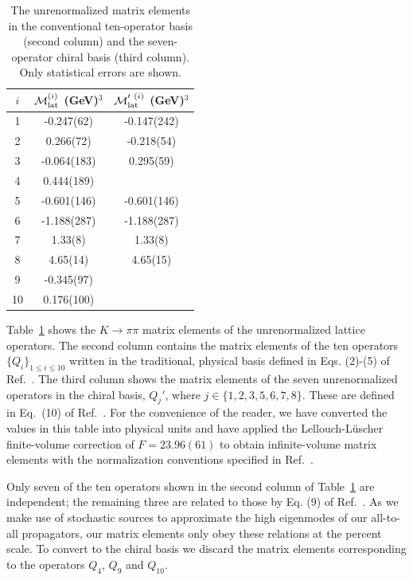 \documentclass[aps,prl,
superscriptaddress,
showpacs,
preprintnumbers,
bibnotes,
amsmath,
amssymb,
twocolumn,
floatfix,
]{revtex4-1}
\begin{document}
\begin{table}
\begin{tabular}{c|c||c}
\hline\hline
$i$  & ${\cal M}^{(i)}_{\rm lat}$ (GeV)$^3$ & ${\cal M}^{\prime\ (i)}_{\rm lat}$ (GeV)$^3$ \\
\hline
1  & -0.247(62)	&-0.147(242)		\\
2  & 0.266(72) 	&-0.218(54)		\\
3  & -0.064(183)	& 0.295(59)		\\
4  & 0.444(189) 	& \textemdash		\\
5  & -0.601(146) 	&-0.601(146)		\\
6  & -1.188(287)	&-1.188(287)		\\
7  & 1.33(8)		& 1.33(8)			\\ 
8  & 4.65(14)		& 4.65(15)		\\ 
9  & -0.345(97) 	& \textemdash		\\
10 & 0.176(100)	& \textemdash 	\\
\end{tabular}
\caption{The unrenormalized matrix elements in the conventional ten-operator basis (second column) and the seven-operator chiral basis (third column). Only statistical errors are shown. \label{tab:Munrenorm} }
\end{table}

Table~\ref{tab:Munrenorm} shows the $K\to\pi\pi$ matrix elements of the unrenormalized lattice operators.  The second column contains the matrix elements of the ten operators $\{Q_i\}_{1\le i \le 10}$ written in the traditional, physical basis defined in Eqs. (2)-(5) of Ref.~\cite{Lehner:2011fz}.  The third column shows the matrix elements of the seven unrenormalized operators  in the chiral basis, $Q_j'$, where $j \in \{1, 2, 3, 5, 6, 7, 8\}$.  These are defined in Eq.~(10) of Ref.~\cite{Lehner:2011fz}.  For the convenience of the reader, we have converted the values in this table into physical units and have applied the Lellouch-L\"{u}scher finite-volume correction of $F= 23.96(61)$ to obtain infinite-volume matrix elements with the normalization conventions specified in Ref.~\cite{Blum:2012uk}.  

Only seven of the ten operators shown in the second column of Table~\ref{tab:Munrenorm} are independent; the remaining three are related to those by Eq. (9) of Ref.~\cite{Lehner:2011fz}.  As we make use of stochastic sources to approximate the high eigenmodes of our all-to-all propagators, our matrix elements only obey these relations at the percent scale.  To convert to the chiral basis we discard the matrix elements corresponding to the operators $Q_4$, $Q_9$ and $Q_{10}$. 
\end{document}

